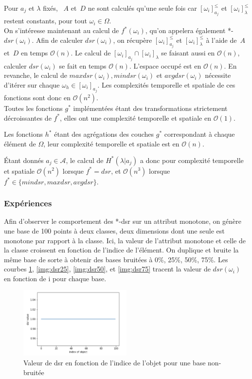 \documentclass[a4paper]{article}
\begin{document}
Pour $a_j$ et $\lambda$ fixés, ~$A$ et~$D$ ne sont calculés qu'une seule fois car
$[\omega_i]^{\leq}_{a_j}$ et $[\omega_i]^{\leq}_{\lambda}$ restent constants,
pour tout $\omega_i \in \Omega$. \\

On s'intéresse maintenant au calcul de $f^*(\omega_i)$, qu'on appelera également
*-$dsr(\omega_i)$.
Afin de calculer $dsr(\omega_i)$, on récupère $[\omega_i]^{\leq}_{a_j}$ et
$[\omega_i]^{\leq}_{\lambda}$ à l'aide de~$A$ et~$D$ en temps $\mathcal{O}(n)$. Le calcul de
$[\omega_i]_{a_j} \cap [\omega_i]_{\lambda}$ se faisant aussi en $\mathcal{O}(n)$,
calculer $dsr(\omega_i)$ se fait en temps $\mathcal{O}(n)$. L'espace occupé est
en $\mathcal{O}(n)$.
En revanche, le calcul de $maxdsr(\omega_i), mindsr(\omega_i)$ et
$avgdsr(\omega_i)$ nécessite d'itérer sur chaque $\omega_h \in
[\omega_i]_{a_j}$. Les complexités temporelle et spatiale de ces fonctions sont
donc en $\mathcal{O}(n^2)$. \\

Toutes les fonctions $g^*$ implémentées étant des transformations strictement
décroissantes de $f^*$, elles ont une complexité temporelle et spatiale en
$\mathcal{O}(1)$. 

Les fonctions $h^*$ étant des agrégations des couches $g^*$ correspondant à
chaque élément de $\Omega$, leur complexité
temporelle et spatiale est en $\mathcal{O}(n)$.

Étant donnés $a_j \in \mathcal{A}$, le calcul de $H^*(\lambda|a_j)$ a donc pour
complexité temporelle et spatiale $\mathcal{O}(n^2)$ lorsque $f^* = dsr$, et
$\mathcal{O}(n^3)$ lorsque $f^* \in \{mindsr, maxdsr, avgdsr\}$.

\subsubsection{Expériences}

Afin d'observer le comportement des *-dsr sur un attribut monotone, on génère
une base de 100 points à deux classes, deux dimensions dont une seule est
monotone par rapport à la classe.  Ici, la valeur de l'attribut monotone et
celle de la classe croissent en fonction de l'indice de l'élément. On duplique
et bruite la même base de sorte à obtenir des bases bruitées à 0\%, 25\%, 50\%,
75\%.  Les courbes \ref{img:dsr0}, \ref{img:dsr25}, \ref{img:dsr50}, et
\ref{img:dsr75} tracent la valeur de $dsr(\omega_i)$ en fonction de i pour
chaque base. \\

\begin{figure}[H]
	\center 
	\includegraphics[width=0.5\textwidth]{images/dsr_0.png}
    \caption{Valeur de dsr en fonction de l'indice de l'objet pour une base
    non-bruitée}
    \label{img:dsr0}
\end{figure}
\end{document}
